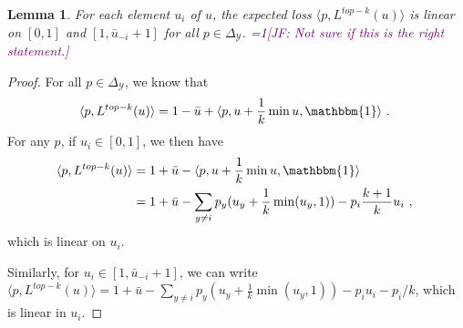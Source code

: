 \documentclass[12pt]{article}
\newcommand{\Comments}{1}
\newcommand{\mynote}[2]{\ifnum\Comments=1\textcolor{#1}{#2}\fi}
\newcommand{\jessie}[1]{\mynote{purple}{[JF: #1]}}
\newcommand{\simplex}{\Delta_\Y}
\newcommand{\Y}{\mathcal{Y}}
\newcommand{\inprod}[2]{\langle #1, #2 \rangle}%
\newcommand{\ones}{\mathbbm{1}}
\newtheorem{lemma}{Lemma}
\begin{document}
\begin{lemma}\label{lem:linear-pieces}
	For each element $u_i$ of $u$, the expected loss $\inprod{p}{L^{top-k}(u)}$ is linear on $[0,1]$ and $[1, \bar u_{-i} + 1]$ for all $p \in \simplex$.
	\jessie{Not sure if this is the right statement.}	
\end{lemma}
\begin{proof}
	For all $p \in \simplex$, we know that 
	\begin{equation}
	\inprod{p}{L^{top-k}(u)} = 1 - \bar u + \inprod{p}{u + \frac 1 k \min{u,\ones}}~.~
	\end{equation}
	For any $p$, if $u_i \in [0,1]$, we then have 
	\begin{align*}
	\inprod{p}{L^{top-k}(u)} &= 1 + \bar u - \inprod{p}{u + \frac 1 k \min{u,\ones}}\\
	 &= 1 + \bar u - \sum_{y \neq i}p_y (u_y + \frac 1 k \min(u_y, 1)) - p_i \frac {k+1} k u_i~,~
	\end{align*}
	which is linear on $u_i$.
	
	Similarly, for $u_i \in [1, \bar u_{-i} + 1]$, we can write $\inprod{p}{L^{top-k}(u)} = 1 + \bar u - \sum_{y \neq i}p_y (u_y + \frac 1 k \min(u_y, 1)) - p_i u_i - p_i/k$, which is linear in $u_i$.
\end{proof}
\end{document}
